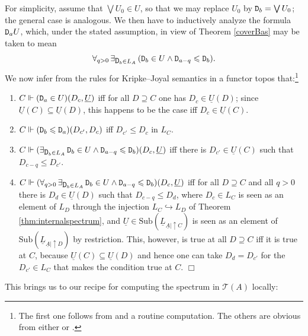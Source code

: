 \documentclass[12pt]{article}
\newcommand{\drie}{\vartriangleleft}
\newcommand{\beq}{\begin{equation}}
\newcommand{\eeq}{\end{equation}}
\newcommand{\alg}[1]{\ensuremath{#1}}
\newcommand{\asstopos}{\ensuremath{\mathcal{T}}}
\newcommand{\prop}[1]{\ensuremath{\mbox{\texttt{#1}}}}
\newcommand{\uA}{\underline{A}}
\newcommand{\TA}{\mathcal{T}(A)}
\renewcommand{\TA}{\asstopos(\alg{A})}
\newenvironment{proof}[1][Proof]%
{ \begin{trivlist}%
  \item[\hskip \labelsep {\bfseries #1}]%
}%
{ \end{trivlist}%
}
\newcommand{\qed}{\nobreak\hfill$\Box$}
\begin{document}
\begin{proof}
For simplicity,   assume  that $\bigvee U_0\in U$, so that we may replace $U_0$ by $\prop{D}_b=\bigvee U_0$; the general case is analogous. We then have to inductively analyze the formula $ \prop{D}_a \drie U$, 
 which, under the stated assumption,  in view of Theorem \ref{coverBas} may be taken to mean
\beq
 \forall_{q>0}\, \exists_{\prop{D}_b\in L_A}\, (\prop{D}_b\in U\wed  \prop{D}_{a-q}\leqslant \prop{D}_b). \label{meaning}
\eeq
We now  infer from the rules for  Kripke--Joyal semantics in a functor topos that:\footnote{The first one follows from 
\cite[Prop.\ 6.6.10]{borceux3} and a routine computation. The others are obvious from either  \cite[\S VI.7]{maclanemoerdijk92}
or \cite[\S 6.6]{borceux3}.}
 \begin{enumerate}
\item  $C\Vdash(\prop{D}_a\in U)(D_c,\underline{U})$ iff   for all $D\supseteq C$ one has $D_c\in \underline{U}(D)$; 
since $\underline{U}(C)\subseteq \underline{U}(D)$, this happens to be the case iff
$D_c\in \underline{U}(C)$.
\item $C\Vdash(\prop{D}_b\leqslant \prop{D}_a)(D_{c'},D_c)$ iff $D_{c'}\leqslant D_c$ in $L_C$.
\item $C\Vdash(\exists_{\prop{D}_b\in L_A}\, \prop{D}_b\in U\wed  \prop{D}_{a-q}\leqslant \prop{D}_b)(D_c,\underline{U})$
iff there is $D_{c'}\in \underline{U}(C)$ such that $D_{c-q}\leqslant D_{c'}$.
\item  $C\Vdash(\forall_{q>0}\, \exists_{\prop{D}_b\in L_A}\, \prop{D}_b\in U\wed  \prop{D}_{a-q}\leqslant \prop{D}_b)(D_c,\underline{U})$ iff for all $D\supseteq C$ and all $q>0$ there is $D_d\in \underline{U}(D)$ such that $D_{c-q}\leqslant D_d$,
where  $D_c\in L_C$ is seen as an element of $L_D$ through the injection $L_C\hookrightarrow L_D$ of 
Theorem \ref{thm:internalspectrum}, and  $\underline{U}\in \mathrm{Sub}(\underline{L}_{\uA|\uparrow C})$
is seen as an element of $\mathrm{Sub}(\underline{L}_{\uA|\uparrow D})$ by restriction.
 This, however,  is true at all $D\supseteq C$ iff it is true at $C$, because $\underline{U}(C)\subseteq \underline{U}(D)$ and hence one can take $D_d=D_{c'}$ for the $D_{c'}\in L_C$ that makes the condition true at $C$. \qed
 \end{enumerate}
\end{proof}
This brings us to our recipe for computing the spectrum in $\TA$  locally:
\end{document}
